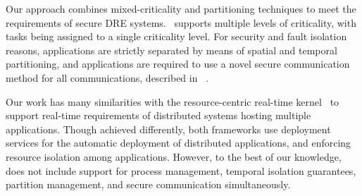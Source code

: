 
Our approach combines mixed-criticality and partitioning techniques 
to meet the requirements of secure DRE systems.
\iap\ supports multiple levels
of criticality, with tasks being assigned to a single criticality
level. For security and fault isolation reasons, applications are
strictly separated by means of spatial and temporal partitioning, and
applications are required to use a novel secure communication method
for all communications, described in \iap\ \cite{ISIS_F6_Aerospace:12}.

Our work has many similarities with the resource-centric real-time
kernel~\cite{DistributedRK-Rajkumar08} to support real-time
requirements of distributed systems hosting multiple applications. 
Though achieved differently, both frameworks use deployment services
for the automatic deployment of distributed applications, and enforcing 
resource isolation among applications. However, to the best of our knowledge,
\cite{DistributedRK-Rajkumar08} does not include support for process
management, temporal isolation guarantees, partition management, and
secure communication simultaneously. 

